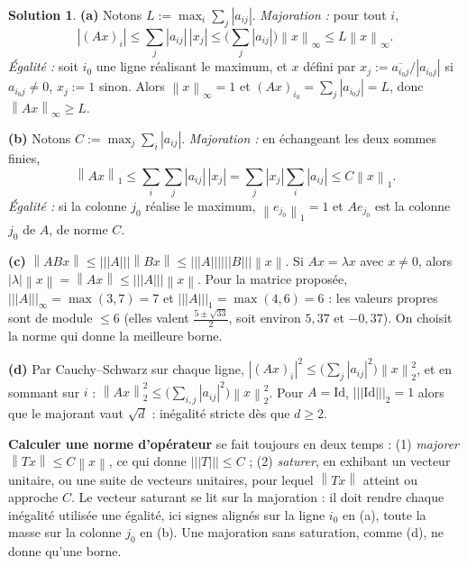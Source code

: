 \documentclass[11pt,a4paper]{article}
\newcommand{\norm}[1]{\left\|#1\right\|}
\newcommand{\opnorm}[1]{|\!|\!|#1|\!|\!|}
\theoremstyle{definition}
\newtheorem*{solution}{Solution}
\begin{document}
\begin{solution}
\noindent\textbf{(a)} Notons $L:=\max_i\sum_j|a_{ij}|$. \emph{Majoration :} pour tout $i$,
\[
|(Ax)_i|\le\sum_j|a_{ij}|\,|x_j|\le\Big(\sum_j|a_{ij}|\Big)\norm x_\infty\le L\norm x_\infty .
\]
\emph{Égalité :} soit $i_0$ une ligne réalisant le maximum, et $x$ défini par $x_j:=\overline{a_{i_0j}}/|a_{i_0j}|$ si $a_{i_0j}\ne0$, $x_j:=1$ sinon. Alors $\norm x_\infty=1$ et $(Ax)_{i_0}=\sum_j|a_{i_0j}|=L$, donc $\norm{Ax}_\infty\ge L$.

\medskip
\noindent\textbf{(b)} Notons $C:=\max_j\sum_i|a_{ij}|$. \emph{Majoration :} en échangeant les deux sommes finies,
\[
\norm{Ax}_1\le\sum_i\sum_j|a_{ij}|\,|x_j|=\sum_j|x_j|\sum_i|a_{ij}|\le C\norm x_1 .
\]
\emph{Égalité :} si la colonne $j_0$ réalise le maximum, $\norm{e_{j_0}}_1=1$ et $Ae_{j_0}$ est la colonne $j_0$ de $A$, de norme $C$.

\medskip
\noindent\textbf{(c)} $\norm{ABx}\le\opnorm A\norm{Bx}\le\opnorm A\opnorm B\norm x$. Si $Ax=\lambda x$ avec $x\ne0$, alors $|\lambda|\norm x=\norm{Ax}\le\opnorm A\norm x$. Pour la matrice proposée, $\opnorm A_\infty=\max(3,7)=7$ et $\opnorm A_1=\max(4,6)=6$ : les valeurs propres sont de module $\le6$ (elles valent $\frac{5\pm\sqrt{33}}2$, soit environ $5{,}37$ et $-0{,}37$). On choisit la norme qui donne la meilleure borne.

\medskip
\noindent\textbf{(d)} Par Cauchy--Schwarz sur chaque ligne, $|(Ax)_i|^2\le\big(\sum_j|a_{ij}|^2\big)\norm x_2^2$, et en sommant sur $i$ : $\norm{Ax}_2^2\le\big(\sum_{i,j}|a_{ij}|^2\big)\norm x_2^2$. Pour $A=\mathrm{Id}$, $\opnorm{\mathrm{Id}}_2=1$ alors que le majorant vaut $\sqrt d$ : inégalité stricte dès que $d\ge2$.
\end{solution}

\begin{methode}
\textbf{Calculer une norme d'opérateur} se fait toujours en deux temps : (1) \emph{majorer} $\norm{Tx}\le C\norm x$, ce qui donne $\opnorm T\le C$ ; (2) \emph{saturer}, en exhibant un vecteur unitaire, ou une suite de vecteurs unitaires, pour lequel $\norm{Tx}$ atteint ou approche $C$. Le vecteur saturant se lit sur la majoration : il doit rendre chaque inégalité utilisée une égalité, ici signes alignés sur la ligne $i_0$ en (a), toute la masse sur la colonne $j_0$ en (b). Une majoration sans saturation, comme (d), ne donne qu'une borne.
\end{methode}
\end{document}
